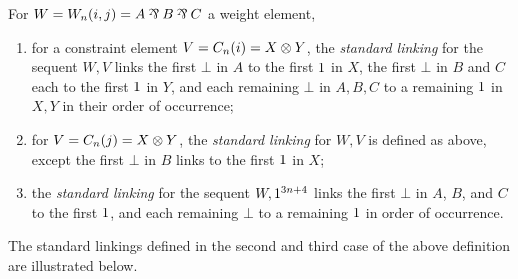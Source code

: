 \documentclass{lmcs}
\begin{document}
                                                                                                                                                                                                                                                                                                                                                                                                                                                                                  
\begin{definition}
\label{def:standard linkings}
For $W=W_n(i,j)=A\pr B\pr C$ a weight element,
\begin{enumerate}
	\item
for a constraint element $V=C_n(i)=X\otimes Y$, the \emph{standard linking} for the sequent $W,V$ links the first $\bot$ in $A$ to the first $1$ in $X$, the first $\bot$ in $B$ and $C$ each to the first $1$ in $Y$, and each remaining $\bot$ in $A,B,C$ to a remaining $1$ in $X,Y$ in their order of occurrence;
	\item
for $V=C_n(j)=X\otimes Y$, the \emph{standard linking} for $W,V$ is defined as above, except the first $\bot$ in $B$ links to the first $1$ in $X$;
	\item
the \emph{standard linking} for the sequent $W,1^{3n+4}$ links the first $\bot$ in $A$, $B$, and $C$ to the first $1$, and each remaining $\bot$ to a remaining $1$ in order of occurrence.
\end{enumerate}
\end{definition}

The standard linkings defined in the second and third case of the above definition are illustrated below.
\end{document}
